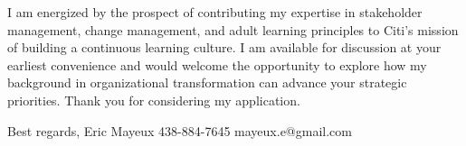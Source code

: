 I am energized by the prospect of contributing my expertise in stakeholder management, change management, and adult learning principles to Citi's mission of building a continuous learning culture. I am available for discussion at your earliest convenience and would welcome the opportunity to explore how my background in organizational transformation can advance your strategic priorities. Thank you for considering my application.

Best regards,
Eric Mayeux
438-884-7645
mayeux.e@gmail.com
